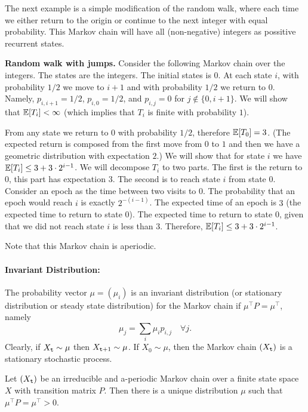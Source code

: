 The next example is a simple modification of the random walk, where each time we either return to the origin or continue to the next integer with equal probability. 
This Markov chain will have all (non-negative) integers as possitive recurrent states.

\begin{example}
{\bf Random walk with jumps.}
%
Consider the following Markov chain over the integers. The states
are the integers. The initial states is $0$. At each state $i$, with
probability $1/2$ we move to $i+1$ and with probability $1/2$ we
return to $0$. Namely, $p_{i,i+1}=1/2$, $p_{i,0}=1/2$, and $p_{i,j}
=0$ for $j \not\in \{0,i+ 1\}$. We will show that $\mathbb{E}[T_i]<\infty$
(which implies that $T_i$ is finite with probability $1$).

From any state we return to $0$ with probability $1/2$, therefore
$\mathbb{E}[T_0]=3$. (The expected return is composed from the first move from $0$ to $1$ and then we have a geometric distribution with expectation $2$.) We will show that for state $i$ we have
$\mathbb{E}[T_i]\leq3+3\cdot 2^{i-1}$. We will decompose $T_i$ to two parts. The
first is the return to $0$, this part has expectation $3$. The
second is to reach state $i$ from state $0$. Consider an epoch as
the time between two visits to $0$. The probability that an epoch
would reach $i$ is exactly $2^{-(i-1)}$. The expected time of an epoch
is $3$ (the expected time to return to state $0$). The expected time
to return to state $0$, given that we did not reach state $i$ is
less than $3$. Therefore, $\mathbb{E}[T_i]\leq 3+3\cdot 2^{i-1}$.

Note that this Markov chain is aperiodic.
\end{example}



\paragraph{Invariant Distribution:} %
The probability vector $\mu  = ({\mu_i})$ is an invariant
distribution (or stationary distribution or steady state
distribution) for the Markov chain if $\mu^\top P = \mu^\top$,
namely
\[{\mu_j} = \sum_i {{\mu_i}} {p_{i,j}}\quad \forall j.\]
Clearly, if ${X_{\tt t}} \sim \mu $ then ${X_{{\tt t} + 1}} \sim \mu
$. If ${X_0} \sim \mu $, then the Markov chain $({X_{\tt t}})$ is a
stationary stochastic process.


\begin{theorem}
\label{Thm:MC-stationary}
 Let $({X_{\tt t}})$ be an irreducible and
a-periodic Markov chain over a finite state space $X$ with
transition matrix $P$. Then there is a unique distribution $\mu$
such that $\mu^\top P = \mu^\top >0$.
\end{theorem}

